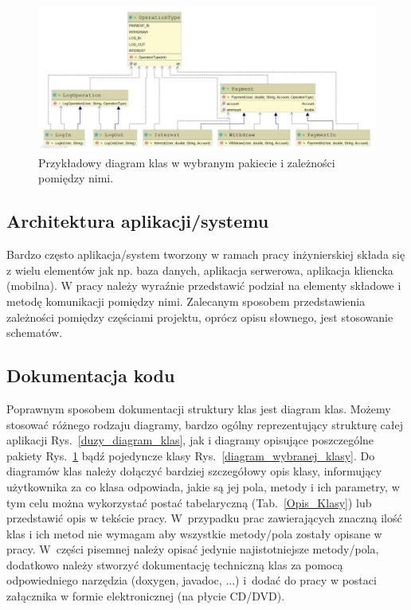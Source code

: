 \documentclass[12pt,a4paper]{article}
\begin{document}
\begin{figure}[h]
\centering
\includegraphics[width = \textwidth]{DiagramKlasPakiet.jpg}
\caption{Przykładowy diagram klas w wybranym pakiecie i zależności pomiędzy nimi.}\label{diagram_klas_pakiet}
\end{figure}


\subsection{Architektura aplikacji/systemu}
Bardzo często aplikacja/system tworzony w ramach pracy inżynierskiej składa się z wielu elementów jak np. baza danych, aplikacja serwerowa, aplikacja kliencka (mobilna). W pracy należy wyraźnie przedstawić podział na elementy składowe i metodę komunikacji pomiędzy nimi. Zalecanym sposobem przedstawienia zależności pomiędzy częściami projektu, oprócz opisu słownego, jest stosowanie schematów.

\subsection{Dokumentacja kodu}
 Poprawnym sposobem dokumentacji struktury klas jest diagram klas. Możemy stosować różnego rodzaju diagramy, bardzo ogólny reprezentujący strukturę całej aplikacji Rys.~\ref{duzy_diagram_klas}, jak i diagramy opisujące poszczególne pakiety Rys.~\ref{diagram_klas_pakiet} bądź pojedyncze klasy Rys.~\ref{diagram_wybranej_klasy}. Do diagramów klas należy dołączyć bardziej szczegółowy opis klasy, informujący użytkownika za co klasa odpowiada, jakie są jej pola, metody i ich parametry, w tym celu można wykorzystać postać tabelaryczną (Tab.~\ref{Opis_Klasy}) lub przedstawić opis w tekście pracy. W~przypadku prac zawierających znaczną ilość klas i ich metod nie wymagam aby wszystkie metody/pola zostały opisane w pracy. W~części  pisemnej należy opisać jedynie najistotniejsze metody/pola, dodatkowo należy stworzyć dokumentację techniczną klas za pomocą odpowiedniego narzędzia (doxygen, javadoc, ...) i~dodać do pracy w postaci załącznika w formie elektronicznej (na płycie CD/DVD).
\end{document}
